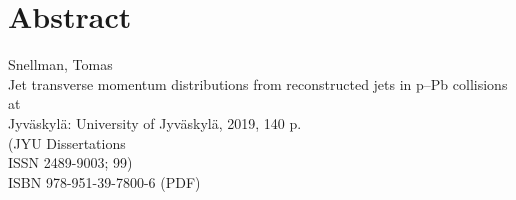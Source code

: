 



%
%
%
%
%
%
%
%
%
%
%
%
%
%
%
%
%
\thispagestyle{empty}
\section*{Abstract} 

Snellman, Tomas \\
Jet transverse momentum distributions from reconstructed jets in p--Pb collisions at \\
Jyväskylä: University of Jyväskylä, 2019, 140 p. \\
(JYU Dissertations \\
ISSN 2489-9003; 99) \\
ISBN 978-951-39-7800-6 (PDF) \\
~\\

